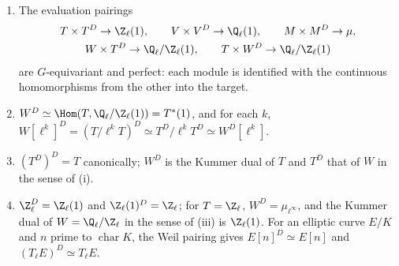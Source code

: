 \begin{proposition}\label{prop:galcoh:kummer-duals}
\begin{enumerate}[label=(\roman*)]
\item The evaluation pairings
\begin{gather*}
T\times T^D\to\Z_\ell(1),\qquad V\times V^D\to\Q_\ell(1),\qquad M\times M^D\to\mu,\\
W\times T^D\to\Q_\ell/\Z_\ell(1),\qquad T\times W^D\to\Q_\ell/\Z_\ell(1)
\end{gather*}
are $G$-equivariant and perfect: each module is identified with the continuous homomorphisms from the other into the target.
\item $W^D\simeq\Hom(T,\Q_\ell/\Z_\ell(1))=T^*(1)$, and for each $k$, $W[\ell^k]^D=(T/\ell^kT)^D\simeq T^D/\ell^kT^D\simeq W^D[\ell^k]$.
\item $(T^D)^D=T$ canonically; $W^D$ is the Kummer dual of $T$ and $T^D$ that of $W$ in the sense of (i).
\item $\Z_\ell^D=\Z_\ell(1)$ and $\Z_\ell(1)^D=\Z_\ell$; for $T=\Z_\ell$, $W^D=\mu_{\ell^\infty}$, and the Kummer dual of $W=\Q_\ell/\Z_\ell$ in the sense of (iii) is $\Z_\ell(1)$. For an elliptic curve $E/K$ and $n$ prime to
$\operatorname{char}K$, the Weil pairing gives $E[n]^D\simeq E[n]$ and $(T_\ell E)^D\simeq T_\ell E$.
\end{enumerate}
\end{proposition}

